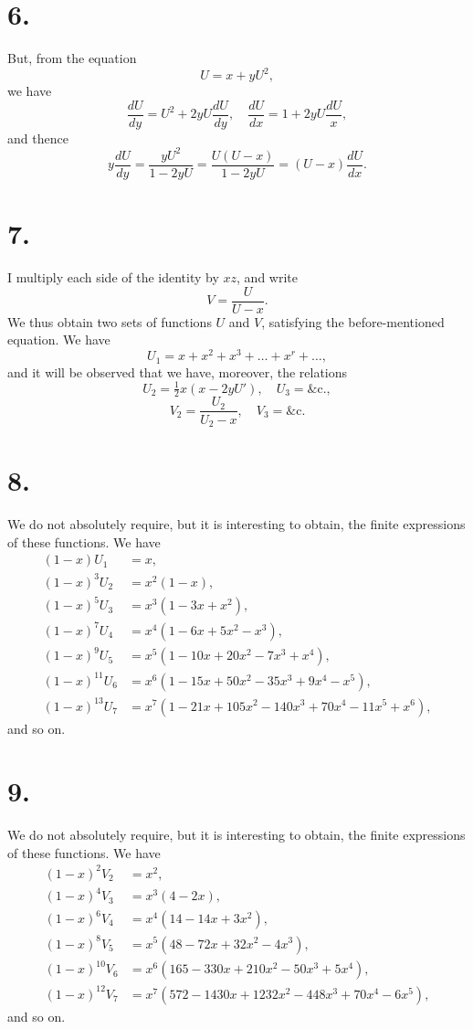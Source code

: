 \documentclass[11pt,a4paper]{book}
\begin{document}
\section*{6.}
But, from the equation
\[
U = x + yU^2,
\]
we have
\[
\frac{dU}{dy} = U^2 + 2yU\frac{dU}{dy}, \quad \frac{dU}{dx} = 1 + 2yU\frac{dU}{x},
\]
and thence
\[
y\frac{dU}{dy} = \frac{yU^2}{1 - 2yU} = \frac{U(U - x)}{1 - 2yU} = (U - x)\frac{dU}{dx}.
\]

\section*{7.}
I multiply each side of the identity by $xz$, and write
\[
V = \frac{U}{U - x}.
\]
We thus obtain two sets of functions $U$ and $V$, satisfying the before-mentioned equation. We have
\[
U_1 = x + x^2 + x^3 + \ldots + x^r + \ldots,
\]
and it will be observed that we have, moreover, the relations
\[
U_2 = \tfrac{1}{2}x(x - 2yU'), \quad U_3 = \&\text{c.},
\]
\[
V_2 = \frac{U_2}{U_2 - x}, \quad V_3 = \&\text{c.}
\]

\section*{8.}
We do not absolutely require, but it is interesting to obtain, the finite expressions of these functions. We have
\begin{align*}
(1 - x)U_1 &= x, \\
(1 - x)^3U_2 &= x^2(1 - x), \\
(1 - x)^5U_3 &= x^3(1 - 3x + x^2), \\
(1 - x)^7U_4 &= x^4(1 - 6x + 5x^2 - x^3), \\
(1 - x)^9U_5 &= x^5(1 - 10x + 20x^2 - 7x^3 + x^4), \\
(1 - x)^{11}U_6 &= x^6(1 - 15x + 50x^2 - 35x^3 + 9x^4 - x^5), \\
(1 - x)^{13}U_7 &= x^7(1 - 21x + 105x^2 - 140x^3 + 70x^4 - 11x^5 + x^6),
\end{align*}
and so on.

\section*{9.}
We do not absolutely require, but it is interesting to obtain, the finite expressions of these functions. We have
\begin{align*}
(1 - x)^2V_2 &= x^2, \\
(1 - x)^4V_3 &= x^3(4 - 2x), \\
(1 - x)^6V_4 &= x^4(14 - 14x + 3x^2), \\
(1 - x)^8V_5 &= x^5(48 - 72x + 32x^2 - 4x^3), \\
(1 - x)^{10}V_6 &= x^6(165 - 330x + 210x^2 - 50x^3 + 5x^4), \\
(1 - x)^{12}V_7 &= x^7(572 - 1430x + 1232x^2 - 448x^3 + 70x^4 - 6x^5),
\end{align*}
and so on.
\end{document}
